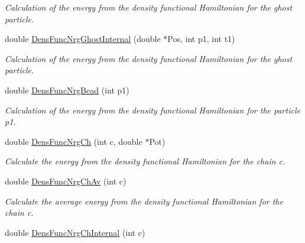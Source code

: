 \begin{DoxyCompactItemize}
\begin{DoxyCompactList}\small\item\em Calculation of the energy from the density functional Hamiltonian for the ghost particle. \end{DoxyCompactList}\item 
double \hyperlink{classForces_a75fb72ed9ede20a211933fe11dabebcf}{Dens\+Func\+Nrg\+Ghost\+Internal} (double $\ast$Pos, int p1, int t1)\hypertarget{classForces_a75fb72ed9ede20a211933fe11dabebcf}{}\label{classForces_a75fb72ed9ede20a211933fe11dabebcf}

\begin{DoxyCompactList}\small\item\em Calculation of the energy from the density functional Hamiltonian for the ghost particle. \end{DoxyCompactList}\item 
double \hyperlink{classForces_aaf00acd2a6784650ce2b34f2c802b6c4}{Dens\+Func\+Nrg\+Bead} (int p1)\hypertarget{classForces_aaf00acd2a6784650ce2b34f2c802b6c4}{}\label{classForces_aaf00acd2a6784650ce2b34f2c802b6c4}

\begin{DoxyCompactList}\small\item\em Calculation of the energy from the density functional Hamiltonian for the particle p1. \end{DoxyCompactList}\item 
double \hyperlink{classForces_ad288fce3211ed5cafbe899b4d3ca08f5}{Dens\+Func\+Nrg\+Ch} (int c, double $\ast$Pot)
\begin{DoxyCompactList}\small\item\em Calculate the energy from the density functional Hamiltonian for the chain c. \end{DoxyCompactList}\item 
double \hyperlink{classForces_a3d6dfad06fbcd3a6b9f84b2ccd40f1ef}{Dens\+Func\+Nrg\+Ch\+Av} (int c)\hypertarget{classForces_a3d6dfad06fbcd3a6b9f84b2ccd40f1ef}{}\label{classForces_a3d6dfad06fbcd3a6b9f84b2ccd40f1ef}

\begin{DoxyCompactList}\small\item\em Calculate the average energy from the density functional Hamiltonian for the chain c. \end{DoxyCompactList}\item 
double \hyperlink{classForces_a424676c9ec7046ecef5f6df4a4a104e8}{Dens\+Func\+Nrg\+Ch\+Internal} (int c)\hypertarget{classForces_a424676c9ec7046ecef5f6df4a4a104e8}{}\label{classForces_a424676c9ec7046ecef5f6df4a4a104e8}


\end{DoxyCompactItemize}
